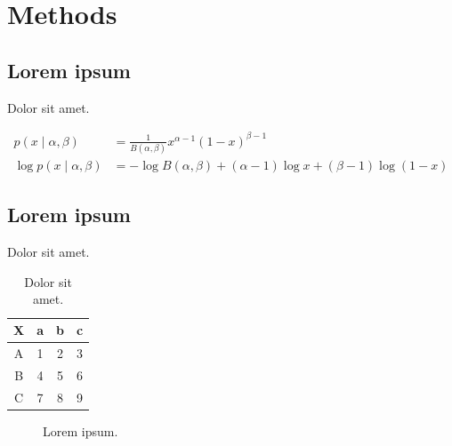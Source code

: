 \documentclass[main.tex]{subfiles}
\begin{document}
\section{Methods}

\subsection{Lorem ipsum}

Dolor sit amet\cite{LoremIpsum2018}.

\begin{align}
    p\left(x \mid \alpha, \beta \right)
     & = \frac{
             1
         }{
             B(\alpha, \beta)
         }
         x^{\alpha - 1} {(1 - x)}^{\beta - 1}
    \\
    \log p\left(x \mid \alpha, \beta \right)
     & = - \log B(\alpha, \beta)
       + (\alpha - 1) \log x
       + (\beta - 1) \log (1 - x)
\end{align}

\subsection{Lorem ipsum}

Dolor sit amet.

\begin{table}[H]
    \centering

    \begin{tabular}{cccc}
        \hline
        X & a & b & c \tabularnewline
        \hline
        \hline
        A & 1 & 2 & 3 \tabularnewline
        B & 4 & 5 & 6 \tabularnewline
        C & 7 & 8 & 9 \tabularnewline
        \hline
    \end{tabular}

    \caption{Dolor sit amet.}
\end{table}

\begin{figure}[H]
    \centering
    \caption{Lorem ipsum.}
\end{figure}
\end{document}
